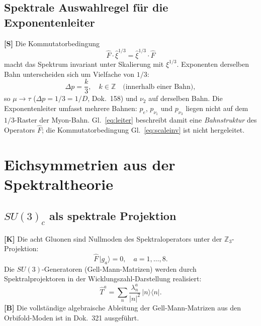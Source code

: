 \subsection{Spektrale Auswahlregel für die Exponentenleiter}

\textbf{[S]} Die Kommutatorbedingung
\begin{equation}
  \hat{F}\cdot\hat{\xi}^{1/3} = \hat{\xi}^{1/3}\cdot\hat{F}
  \label{eq:scaleinv}
\end{equation}
macht das Spektrum invariant unter Skalierung mit $\xi^{1/3}$.
Exponenten derselben Bahn unterscheiden sich um Vielfache von $1/3$:
\begin{equation}
  \Delta p = \frac{k}{3},\quad k \in \mathbb{Z}\quad\text{(innerhalb einer Bahn)},
  \label{eq:leiter}
\end{equation}
so $\mu \to \tau$ ($\Delta p = 1/3 = 1/D$, Dok.~158) und $\nu_2$ auf
derselben Bahn. Die Exponentenleiter umfasst mehrere Bahnen: $p_e$,
$p_{\nu_1}$ und $p_{\nu_3}$ liegen nicht auf dem $1/3$-Raster der
Myon-Bahn. Gl.~\eqref{eq:leiter} beschreibt damit eine
\emph{Bahnstruktur} des Operators $\hat{F}$; die Kommutatorbedingung
Gl.~\eqref{eq:scaleinv} ist nicht hergeleitet.

\section{Eichsymmetrien aus der Spektraltheorie}

\subsection{$SU(3)_c$ als spektrale Projektion}

\textbf{[K]} Die acht Gluonen sind Nullmoden des Spektraloperators
unter der $\mathbb{Z}_3$-Projektion:
\begin{equation}
  \hat{F}\,|g_a\rangle = 0,\quad a = 1,\ldots,8.
  \label{eq:gluon}
\end{equation}
Die $SU(3)$-Generatoren (Gell-Mann-Matrizen) werden durch
Spektralprojektoren in der Wicklungszahl-Darstellung realisiert:
\begin{equation}
  \hat{T}^a = \sum_n \frac{\lambda_n^a}{|n|^2}\,|n\rangle\langle n|.
  \label{eq:su3}
\end{equation}
\textbf{[B]} Die vollständige algebraische Ableitung der Gell-Mann-Matrizen
aus den Orbifold-Moden ist in Dok.~321 ausgeführt.

